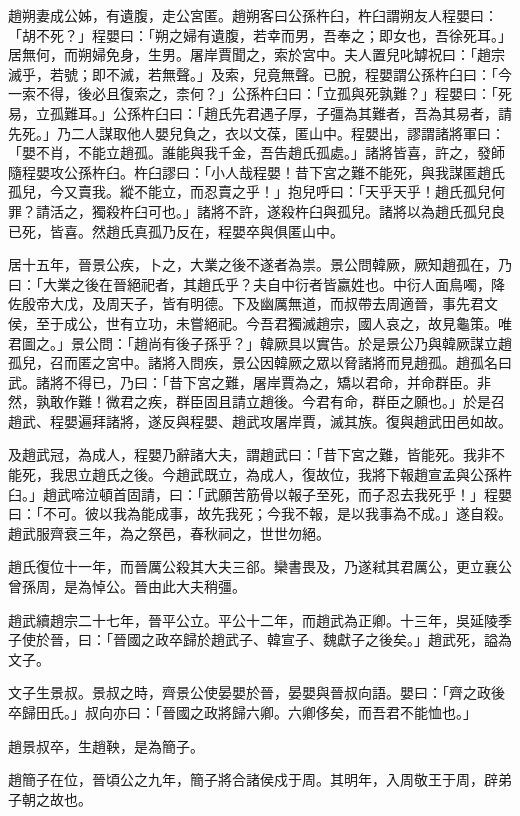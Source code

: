 \begin{pinyinscope}
趙朔妻成公姊，有遺腹，走公宮匿。趙朔客曰公孫杵臼，杵臼謂朔友人程嬰曰：「胡不死？」程嬰曰：「朔之婦有遺腹，若幸而男，吾奉之；即女也，吾徐死耳。」居無何，而朔婦免身，生男。屠岸賈聞之，索於宮中。夫人置兒叱罅祝曰：「趙宗滅乎，若號；即不滅，若無聲。」及索，兒竟無聲。已脫，程嬰謂公孫杵臼曰：「今一索不得，後必且復索之，柰何？」公孫杵臼曰：「立孤與死孰難？」程嬰曰：「死易，立孤難耳。」公孫杵臼曰：「趙氏先君遇子厚，子彊為其難者，吾為其易者，請先死。」乃二人謀取他人嬰兒負之，衣以文葆，匿山中。程嬰出，謬謂諸將軍曰：「嬰不肖，不能立趙孤。誰能與我千金，吾告趙氏孤處。」諸將皆喜，許之，發師隨程嬰攻公孫杵臼。杵臼謬曰：「小人哉程嬰！昔下宮之難不能死，與我謀匿趙氏孤兒，今又賣我。縱不能立，而忍賣之乎！」抱兒呼曰：「天乎天乎！趙氏孤兒何罪？請活之，獨殺杵臼可也。」諸將不許，遂殺杵臼與孤兒。諸將以為趙氏孤兒良已死，皆喜。然趙氏真孤乃反在，程嬰卒與俱匿山中。

居十五年，晉景公疾，卜之，大業之後不遂者為祟。景公問韓厥，厥知趙孤在，乃曰：「大業之後在晉絕祀者，其趙氏乎？夫自中衍者皆嬴姓也。中衍人面鳥噣，降佐殷帝大戊，及周天子，皆有明德。下及幽厲無道，而叔帶去周適晉，事先君文侯，至于成公，世有立功，未嘗絕祀。今吾君獨滅趙宗，國人哀之，故見龜策。唯君圖之。」景公問：「趙尚有後子孫乎？」韓厥具以實告。於是景公乃與韓厥謀立趙孤兒，召而匿之宮中。諸將入問疾，景公因韓厥之眾以脅諸將而見趙孤。趙孤名曰武。諸將不得已，乃曰：「昔下宮之難，屠岸賈為之，矯以君命，并命群臣。非然，孰敢作難！微君之疾，群臣固且請立趙後。今君有命，群臣之願也。」於是召趙武、程嬰遍拜諸將，遂反與程嬰、趙武攻屠岸賈，滅其族。復與趙武田邑如故。

及趙武冠，為成人，程嬰乃辭諸大夫，謂趙武曰：「昔下宮之難，皆能死。我非不能死，我思立趙氏之後。今趙武既立，為成人，復故位，我將下報趙宣孟與公孫杵臼。」趙武啼泣頓首固請，曰：「武願苦筋骨以報子至死，而子忍去我死乎！」程嬰曰：「不可。彼以我為能成事，故先我死；今我不報，是以我事為不成。」遂自殺。趙武服齊衰三年，為之祭邑，春秋祠之，世世勿絕。

趙氏復位十一年，而晉厲公殺其大夫三郤。欒書畏及，乃遂弒其君厲公，更立襄公曾孫周，是為悼公。晉由此大夫稍彊。

趙武續趙宗二十七年，晉平公立。平公十二年，而趙武為正卿。十三年，吳延陵季子使於晉，曰：「晉國之政卒歸於趙武子、韓宣子、魏獻子之後矣。」趙武死，謚為文子。

文子生景叔。景叔之時，齊景公使晏嬰於晉，晏嬰與晉叔向語。嬰曰：「齊之政後卒歸田氏。」叔向亦曰：「晉國之政將歸六卿。六卿侈矣，而吾君不能恤也。」

趙景叔卒，生趙鞅，是為簡子。

趙簡子在位，晉頃公之九年，簡子將合諸侯戍于周。其明年，入周敬王于周，辟弟子朝之故也。


\end{pinyinscope}
